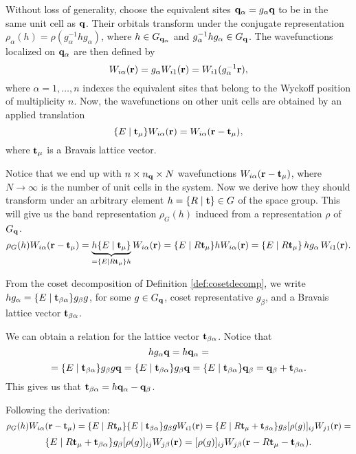 Without loss of generality, choose the equivalent sites ${\vb{q}}_\alpha = g_{\alpha} {\vb{q}}$ to be in the same unit cell as ${\vb{q}}$. Their orbitals transform under the conjugate representation $\rho_\alpha(h) = \rho(g_\alpha^{-1} h g_\alpha)$, where $h \in G_{{\vb{q}}_\alpha}$ and $g_\alpha^{-1} h g_\alpha \in G_{\vb{q}}$. The wavefunctions localized on ${\vb{q}}_\alpha$ are then defined by
$$
W_{i\alpha}({\vb{r}}) = g_\alpha W_{i1}({\vb{r}}) = W_{i1}(g_\alpha^{-1} {\vb{r}}),
$$
where $\alpha = 1, \ldots, n$ indexes the equivalent sites that belong to the Wyckoff position of multiplicity $n$. Now, the wavefunctions on other unit cells are obtained by an applied translation
$$
\{ E \mid {\vb{t}}_\mu \} W_{i\alpha}({\vb{r}}) = W_{i\alpha}({\vb{r}}-{\vb{t}}_\mu),
$$
where ${\vb{t}}_\mu$ is a Bravais lattice vector.

Notice that we end up with $n \times n_{\vb{q}} \times N$ wavefunctions $W_{i\alpha}({\vb{r}}-{\vb{t}}_\mu)$, where $N \to \infty$ is the number of unit cells in the system. Now we derive how they should transform under an arbitrary element $h = \{ R \mid {\vb{t}} \} \in G$ of the space group. This will give us the band representation $\rho_G(h)$ induced from a representation $\rho$ of $G_{\vb{q}}$.
$$
\rho_G(h) W_{i\alpha}({\vb{r}}-{\vb{t}}_\mu) =
\underbrace{h \{ E \mid {\vb{t}}_\mu \}}_{= \{ E \mid R{\vb{t}}_\mu \} h} W_{i\alpha} ({\vb{r}}) =
\{ E \mid R{\vb{t}}_\mu \} h W_{i\alpha} ({\vb{r}}) =
\{ E \mid R{\vb{t}}_\mu \} \, h g_\alpha \, W_{i1} ({\vb{r}}).
$$

From the coset decomposition of Definition \ref{def:cosetdecomp}, we write $h g_\alpha = \{ E \mid {\vb{t}}_{\beta\alpha} \} g_\beta g$, for some $g \in G_{\vb{q}}$, coset representative $g_\beta$, and a Bravais lattice vector ${\vb{t}}_{\beta\alpha}$.

We can obtain a relation for the lattice vector ${\vb{t}}_{\beta\alpha}$. Notice that
$$
h g_\alpha {\vb{q}} = h {\vb{q}}_\alpha =
$$
$$
= \{ E \mid {\vb{t}}_{\beta\alpha} \} g_\beta g {\vb{q}} = \{ E \mid {\vb{t}}_{\beta\alpha} \} g_\beta {\vb{q}} = \{ E \mid {\vb{t}}_{\beta\alpha} \} {\vb{q}}_\beta = {\vb{q}}_\beta + {\vb{t}}_{\beta\alpha}.
$$
This gives us that ${\vb{t}}_{\beta\alpha} = h {\vb{q}}_\alpha - {\vb{q}}_\beta$.

Following the derivation:
$$
\rho_G(h) W_{i\alpha}({\vb{r}}-{\vb{t}}_\mu) =
\{ E \mid R{\vb{t}}_\mu \} \{ E \mid {\vb{t}}_{\beta\alpha} \} g_\beta g W_{i1}({\vb{r}}) =
\{ E \mid R{\vb{t}}_\mu + {\vb{t}}_{\beta\alpha} \} g_\beta [\rho(g)]_{ij} W_{j1}({\vb{r}}) =
$$
$$
\{ E \mid R{\vb{t}}_\mu + {\vb{t}}_{\beta\alpha} \} g_\beta [\rho(g)]_{ij} W_{j\beta}({\vb{r}}) =
[\rho(g)]_{ij} W_{j\beta}({\vb{r}} - R{\vb{t}}_\mu - {\vb{t}}_{\beta\alpha}).
$$



%



